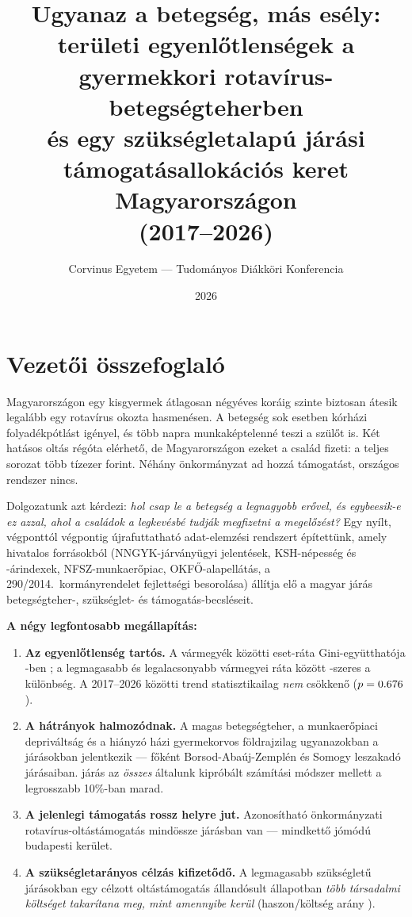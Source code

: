 \documentclass[11pt,a4paper]{article}
\title{\textbf{Ugyanaz a betegség, más esély:\\
területi egyenlőtlenségek a gyermekkori rotavírus-betegségteherben\\
és egy szükségletalapú járási támogatásallokációs keret Magyarországon\\ (2017--2026)}}
\author{Corvinus Egyetem --- Tudományos Diákköri Konferencia}
\date{2026}
\begin{document}
\maketitle

\section*{Vezetői összefoglaló}

\noindent
Magyarországon egy kisgyermek átlagosan négyéves koráig szinte biztosan
átesik legalább egy rotavírus okozta hasmenésen. A betegség sok esetben
kórházi folyadékpótlást igényel, és több napra munkaképtelenné teszi a
szülőt is. Két hatásos oltás régóta elérhető, de Magyarországon ezeket a
család fizeti: a teljes sorozat több tízezer forint. Néhány önkormányzat
ad hozzá támogatást, országos rendszer nincs.

Dolgozatunk azt kérdezi: \emph{hol csap le a betegség a legnagyobb erővel,
és egybeesik-e ez azzal, ahol a családok a legkevésbé tudják megfizetni a
megelőzést?} Egy nyílt, végponttól végpontig újrafuttatható adat-elemzési
rendszert építettünk, amely hivatalos forrásokból (NNGYK-járványügyi
jelentések, KSH-népesség és -árindexek, NFSZ-munkaerőpiac, OKFŐ-alapellátás,
a 290/2014.\ kormányrendelet fejlettségi besorolása) állítja elő a
\nDistricts{} magyar járás betegségteher-, szükséglet- és
támogatás-becsléseit.

\medskip
\noindent\textbf{A négy legfontosabb megállapítás:}
\begin{enumerate}[nosep,leftmargin=1.4em]
\item \textbf{Az egyenlőtlenség tartós.} A vármegyék közötti eset-ráta
Gini-együtthatója \csYear-ben \giniXs{}; a legmagasabb és legalacsonyabb
vármegyei ráta között \maxminXs-szeres a különbség. A 2017--2026 közötti
trend statisztikailag \emph{nem} csökkenő ($p=0.676$).
\item \textbf{A hátrányok halmozódnak.} A magas betegségteher, a
munkaerőpiaci depriváltság és a hiányzó házi gyermekorvos földrajzilag
ugyanazokban a járásokban jelentkezik --- főként Borsod-Abaúj-Zemplén és
Somogy leszakadó járásaiban. \nSpecRobust{} járás az \emph{összes} általunk
kipróbált számítási módszer mellett a legrosszabb 10\%-ban marad.
\item \textbf{A jelenlegi támogatás rossz helyre jut.} Azonosítható
önkormányzati rotavírus-oltástámogatás mindössze \nDistrictsMuni{} járásban
van --- mindkettő jómódú budapesti kerület.
\item \textbf{A szükségletarányos célzás kifizetődő.} A legmagasabb
szükségletű járásokban egy célzott oltástámogatás állandósult állapotban
\emph{több társadalmi költséget takarítana meg, mint amennyibe kerül}
(haszon/költség arány \ceBcrTopNeed).
\end{enumerate}
\end{document}
